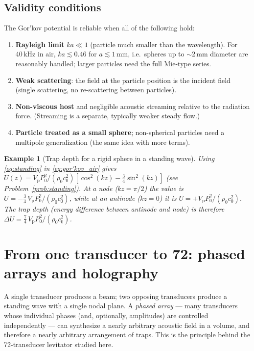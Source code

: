 \documentclass[11pt]{article}
\newtheorem{example}{Example}[section]
\newcommand{\rrho}{\rho_{0}}
\newcommand{\cc}{c_{0}}
\newcommand{\vp}{V_{\mathrm{p}}}
\begin{document}
\subsection{Validity conditions}

The Gor'kov potential is reliable when all of the following hold:
\begin{enumerate}[label=(\alph*)]
  \item \textbf{Rayleigh limit} $ka\ll1$ (particle much smaller than the
  wavelength). For $40\,\mathrm{kHz}$ in air, $ka\lesssim0.46$ for
  $a\lesssim1\,\mathrm{mm}$, i.e.\ spheres up to $\sim2\,\mathrm{mm}$ diameter
  are reasonably handled; larger particles need the full Mie-type series.
  \item \textbf{Weak scattering}: the field at the particle position is the
  incident field (single scattering, no re-scattering between particles).
  \item \textbf{Non-viscous host} and negligible acoustic streaming relative to
  the radiation force. (Streaming is a separate, typically weaker steady flow.)
  \item \textbf{Particle treated as a small sphere}; non-spherical particles
  need a multipole generalization (the same idea with more terms).
\end{enumerate}

\begin{example}[Trap depth for a rigid sphere in a standing wave]
Using \eqref{eq:standing} in \eqref{eq:gor'kov_air} gives
$U(z)=\vp P_{0}^{2}/(\rrho\cc^{2})\left[\cos^{2}(kz)-\tfrac34\sin^{2}(kz)\right]$
(see Problem~\ref{prob:standing}). At a node ($kz=\pi/2$) the value is
$U=-\frac34\,\vp P_{0}^{2}/(\rrho\cc^{2})$, while at an antinode ($kz=0$) it is
$U=+\vp P_{0}^{2}/(\rrho\cc^{2})$. The trap depth (energy difference between
antinode and node) is therefore
$\Delta U=\frac74\,\vp P_{0}^{2}/(\rrho\cc^{2})$.
\end{example}

\section{From one transducer to 72: phased arrays and holography}
\label{sec:arrays}

A single transducer produces a beam; two opposing transducers produce a standing
wave with a single nodal plane. A \emph{phased array} --- many transducers whose
individual phases (and, optionally, amplitudes) are controlled independently ---
can synthesize a nearly arbitrary acoustic field in a volume, and therefore a
nearly arbitrary arrangement of traps. This is the principle behind the
72-transducer levitator studied here.
\end{document}
